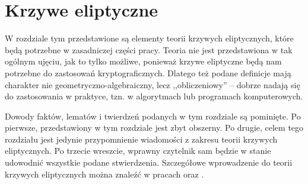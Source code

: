 \chapter{Krzywe eliptyczne}

W rozdziale tym przedstawione są elementy teorii krzywych eliptycznych,
które będą potrzebne w zasadniczej części pracy.
Teoria nie jest przedstawiona w tak ogólnym ujęciu, jak to tylko możliwe,
ponieważ krzywe eliptyczne będą nam potrzebne do zastosowań kryptograficznych.
Dlatego też podane definicje mają charakter
nie geometryczno-algebraiczny, lecz ,,obliczeniowy'' --
dobrze nadają się do zastosowania w praktyce,
tzn. w algorytmach lub programach komputerowych.

Dowody faktów, lematów i twierdzeń podanych w tym rozdziale
są pominięte.
Po pierwsze, przedstawiony w tym rozdziale jest zbyt obszerny.
Po drugie, celem tego rozdziału jest jedynie przypomnienie wiadomości
z zakresu teorii krzywych eliptycznych.
Po trzecie wreszcie, wprawny czytelnik sam będzie w stanie
udowodnić wszystkie podane stwierdzenia.
Szczegółowe wprowadzenie do teorii krzywych eliptycznych
można znaleźć w pracach \cite{ecintro1} oraz \cite{ecintro2}.








